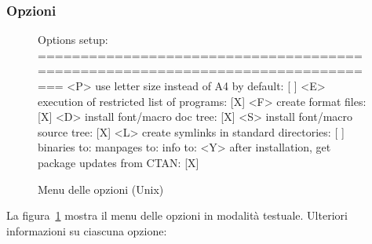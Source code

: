 \documentclass{article}
\begin{document}
\subsubsection{Opzioni}
\label{sec:options}

\begin{figure}[tbh]
\begin{boxedverbatim}
Options setup:
===============================================================================
 <P> use letter size instead of A4 by default: [ ]
 <E> execution of restricted list of programs: [X]
 <F> create format files:                      [X]
 <D> install font/macro doc tree:              [X]
 <S> install font/macro source tree:           [X]
 <L> create symlinks in standard directories:  [ ]
            binaries to:
            manpages to:
                info to:
 <Y> after installation, get package updates from CTAN: [X]
\end{boxedverbatim}
\caption{Menu delle opzioni (Unix)}\label{fig:options-text}
\end{figure}

La figura~\ref{fig:options-text} mostra il menu delle opzioni in modalità
testuale. Ulteriori informazioni su ciascuna opzione:
\end{document}
